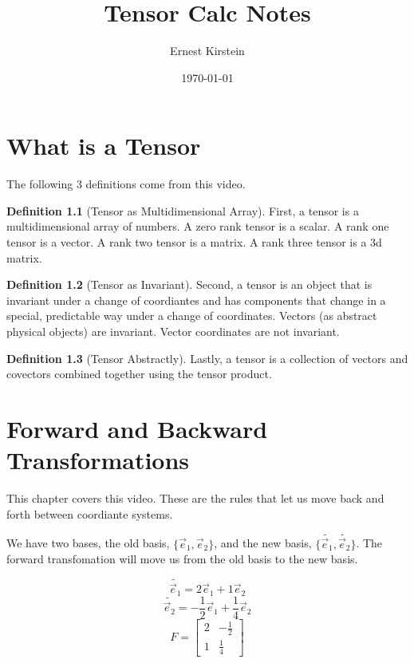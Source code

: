 \documentclass[12pt]{book}
\title{%
  Tensor Calc Notes
}
\author{Ernest Kirstein}
\date{\today}
\theoremstyle{plain}
\theoremstyle{definition}
\newtheorem{definition}{Definition}[chapter]
\theoremstyle{ppart}
\theoremstyle{case}
\theoremstyle{solution}
\begin{document}
\maketitle

\tableofcontents

\chapter{What is a Tensor}

The following 3 definitions come from this \cite{youtube:tensor0} video.

\begin{definition}[Tensor as Multidimensional Array]
First, a tensor is a multidimensional array of numbers.
A zero rank tensor is a scalar. A rank one tensor is a vector. A rank two tensor is a matrix. A rank three tensor is a 3d matrix.
\end{definition}

\begin{definition}[Tensor as Invariant]
Second, a tensor is an object that is invariant under a change of coordiantes and has components that change in a special, predictable
way under a change of coordinates.
Vectors (as abstract physical objects) are invariant. Vector coordinates are not invariant.
\end{definition}

\begin{definition}[Tensor Abstractly]
Lastly, a tensor is a collection of vectors and covectors combined together using the tensor product.
\end{definition}

\chapter{Forward and Backward Transformations}

This chapter covers this \cite{youtube:tensor1} video.
These are the rules that let us move back and forth between coordiante systems.

We have two bases, the old basis, $\{\vec{e}_1, \vec{e}_2\}$, and the new basis, $\{\widetilde{\vec{e}_1}, \widetilde{\vec{e}_2}\}$.
The forward transfomation will move us from the old basis to the new basis.

\[ \widetilde{\vec{e}_1} = 2 \vec{e}_1 + 1 \vec{e}_2 \]
\[ \widetilde{\vec{e}_2} = -\frac{1}{2} \vec{e}_1 + \frac{1}{4} \vec{e}_2 \]
\[
  F =
  \begin{bmatrix}
  2 & -\frac{1}{2} \\
  1 & \frac{1}{4}
  \end{bmatrix}
\]
\end{document}
